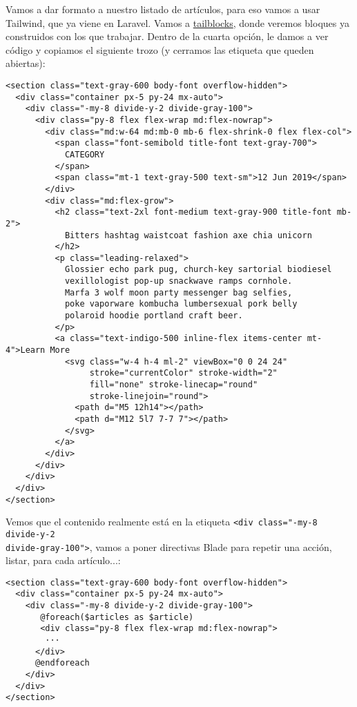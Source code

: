 \documentclass[11pt]{article}
\begin{document}
Vamos a dar formato a nuestro listado de artículos, para eso vamos a
usar Tailwind, que ya viene en Laravel. Vamos a \href{https://tailblocks.cc}{tailblocks}, donde
veremos bloques ya construidos con los que trabajar. Dentro de la
cuarta opción, le damos a ver código y copiamos el siguiente trozo (y
cerramos las etiqueta que queden abiertas):
\begin{verbatim}
<section class="text-gray-600 body-font overflow-hidden">
  <div class="container px-5 py-24 mx-auto">
    <div class="-my-8 divide-y-2 divide-gray-100">
      <div class="py-8 flex flex-wrap md:flex-nowrap">
        <div class="md:w-64 md:mb-0 mb-6 flex-shrink-0 flex flex-col">
          <span class="font-semibold title-font text-gray-700">
            CATEGORY
          </span>
          <span class="mt-1 text-gray-500 text-sm">12 Jun 2019</span>
        </div>
        <div class="md:flex-grow">
          <h2 class="text-2xl font-medium text-gray-900 title-font mb-2">
            Bitters hashtag waistcoat fashion axe chia unicorn
          </h2>
          <p class="leading-relaxed">
            Glossier echo park pug, church-key sartorial biodiesel
            vexillologist pop-up snackwave ramps cornhole.
            Marfa 3 wolf moon party messenger bag selfies,
            poke vaporware kombucha lumbersexual pork belly
            polaroid hoodie portland craft beer.
          </p>
          <a class="text-indigo-500 inline-flex items-center mt-4">Learn More
            <svg class="w-4 h-4 ml-2" viewBox="0 0 24 24"
                 stroke="currentColor" stroke-width="2"
                 fill="none" stroke-linecap="round"
                 stroke-linejoin="round">
              <path d="M5 12h14"></path>
              <path d="M12 5l7 7-7 7"></path>
            </svg>
          </a>
        </div>
      </div>
    </div>
  </div>
</section>
\end{verbatim}

Vemos que el contenido realmente está en la etiqueta \texttt{<div class="-my-8 divide-y-2} \\
\texttt{divide-gray-100">}, vamos a poner directivas Blade para repetir una
acción, listar, para cada artículo...:
\begin{verbatim}
<section class="text-gray-600 body-font overflow-hidden">
  <div class="container px-5 py-24 mx-auto">
    <div class="-my-8 divide-y-2 divide-gray-100">
       @foreach($articles as $article)
       <div class="py-8 flex flex-wrap md:flex-nowrap">
        ···
      </div>
      @endforeach
    </div>
  </div>
</section>
\end{verbatim}
\end{document}
